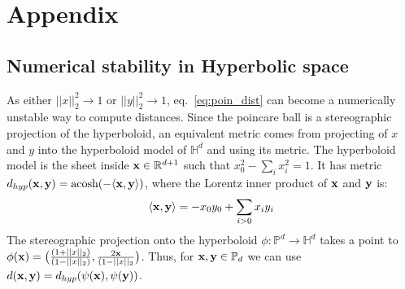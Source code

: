 \documentclass[11pt]{article}
\begin{document}
%
%

\clearpage
\section{Appendix}
\subsection{Numerical stability in Hyperbolic space}
As either $||x||_{2}^{2}\to 1$ or $||y||_{2}^{2} \to 1$, eq.~\ref{eq:poin_dist} can become a numerically unstable way to compute distances.
Since the poincare ball is a stereographic projection of the hyperboloid, an equivalent metric comes from projecting of $x$ and $y$ into the hyperboloid model of $\mathbb{H}^{d}$ and using its metric.
The hyperboloid model is the sheet inside $\bold{x}\in\mathbb{R}^{d+1}$ such that $x_{0}^{2} - \sum_{i} x_{i}^{2} = 1$.
It has metric $d_{hyp}(\bold{x}, \bold{y}) = \text{acosh}(-\langle \bold{x}, \bold{y} \rangle)$, where the Lorentz inner product of $\bold{x}$ and $\bold{y}$ is:
\begin{equation*}
	\langle \bold{x}, \bold{y} \rangle = -x_{0}y_{0} + \sum_{i>0} x_{i}y_{i}
\end{equation*}
The stereographic projection onto the hyperboloid $\phi:\mathbb{P}^{d} \to \mathbb{H}^{d}$ takes a point to $\phi(\bold{x}) = \big(\frac{(1+||x||_{2})}{(1-||x||_{2})}, \frac{2 \bold{x}}{(1- ||x||_{2}}\big)$.
Thus, for $\bold{x}, \bold{y} \in \mathbb{P}_{d}$ we can use $d(\bold{x}, \bold{y}) = d_{hyp}(\psi(\bold{x}), \psi(\bold{y}))$.
\end{document}
